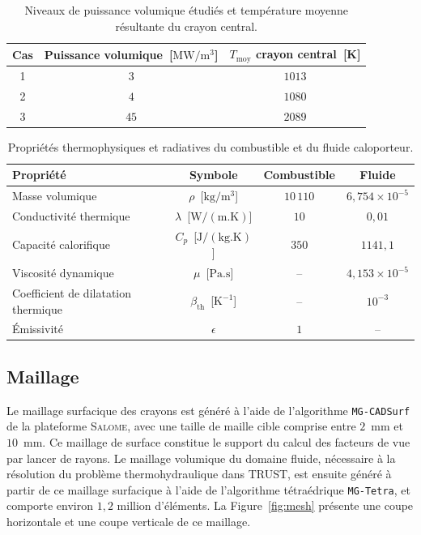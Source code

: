 \begin{table}[H]
\centering
\begin{tabular}{ccc}
\toprule
Cas & Puissance volumique~[$\mathrm{MW/m^3}$] & $T_{\mathrm{moy}}$ crayon central~[K] \\
\midrule
1 & $3$  & $1013$ \\
2 & $4$  & $1080$ \\
3 & $45$ & $2089$ \\
\bottomrule
\end{tabular}
\caption{Niveaux de puissance volumique étudiés et température moyenne résultante du crayon central.}
\label{tab:puissances}
\end{table}

\begin{table}[H]
\centering
\begin{tabular}{lccc}
\toprule
Propriété & Symbole & Combustible & Fluide \\
\midrule
Masse volumique & $\rho$~[$\mathrm{kg/m^3}$] & $10\,110$ & $6{,}754\times10^{-5}$ \\
Conductivité thermique & $\lambda$~[$\mathrm{W/(m.K)}$] & $10$ & $0{,}01$ \\
Capacité calorifique & $C_p$~[$\mathrm{J/(kg.K)}$] & $350$ & $1141{,}1$ \\
Viscosité dynamique & $\mu$~[$\mathrm{Pa.s}$] & -- & $4{,}153\times10^{-5}$ \\
Coefficient de dilatation thermique & $\beta_{\mathrm{th}}$~[$\mathrm{K^{-1}}$] & -- & $10^{-3}$ \\
Émissivité & $\epsilon$ & $1$ & -- \\
\bottomrule
\end{tabular}
\caption{Propriétés thermophysiques et radiatives du combustible et du fluide caloporteur.}
\label{tab:proprietes}
\end{table}

\subsection{Maillage}

Le maillage surfacique des crayons est généré à l'aide de l'algorithme \texttt{MG-CADSurf} de la plateforme \textsc{Salome}, avec une taille de maille cible comprise entre $2$~mm et $10$~mm. Ce maillage de surface constitue le support du calcul des facteurs de vue par lancer de rayons. Le maillage volumique du domaine fluide, nécessaire à la résolution du problème thermohydraulique dans TRUST, est ensuite généré à partir de ce maillage surfacique à l'aide de l'algorithme tétraédrique \texttt{MG-Tetra}, et comporte environ $1{,}2$ million d'éléments. La Figure~\ref{fig:mesh} présente une coupe horizontale et une coupe verticale de ce maillage.


